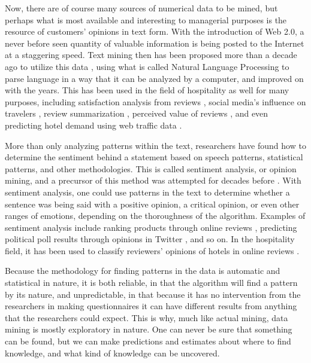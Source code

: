 Now, there are of course many sources of numerical data to be mined, but perhaps what is most available and interesting to managerial purposes is the resource of customers' opinions in text form. With the introduction of Web 2.0, a never before seen quantity of valuable information is being posted to the Internet at a staggering speed. Text mining then has been proposed more than a decade ago to utilize this data \cite[e.g.][]{rajman1998text,nahm2002text}, using what is called Natural Language Processing to parse language in a way that it can be analyzed by a computer, and improved on with the years. This has been used in the field of hospitality as well for many purposes, including satisfaction analysis from reviews \cite[e.g][]{berezina2016, xu2016, xiang2015, hargreaves2015, balbi2018}, social media's influence on travelers \cite[e.g.][]{xiang2010}, review summarization \cite[e.g.][]{hu2017436}, perceived value of reviews \cite[e.g][]{FANG2016498}, and even predicting hotel demand using web traffic data \cite[e.g][]{yang2014}.

More than only analyzing patterns within the text, researchers have found how to determine the sentiment behind a statement based on speech patterns, statistical patterns, and other methodologies. This is called sentiment analysis, or opinion mining, and a precursor of this method was attempted for decades before \cite[][]{stone1966general}. With sentiment analysis, one could use patterns in the text to determine whether a sentence was being said with a positive opinion, a critical opinion, or even other ranges of emotions, depending on the thoroughness of the algorithm. Examples of sentiment analysis include ranking products through online reviews \cite[e.g][]{liu2017149, zhang2011}, predicting political poll results through opinions in Twitter \cite[][]{oconnor2010}, and so on. In the hospitality field, it has been used to classify reviewers' opinions of hotels in online reviews \cite[e.g.]{kim2017362, alsmadi2018}. 

Because the methodology for finding patterns in the data is automatic and statistical in nature, it is both reliable, in that the algorithm will find a pattern by its nature, and unpredictable, in that because it has no intervention from the researchers in making questionnaires it can have different results from anything that the researchers could expect. This is why, much like actual mining, data mining is mostly exploratory in nature. One can never be sure that something can be found, but we can make predictions and estimates about where to find knowledge, and what kind of knowledge can be uncovered. 

